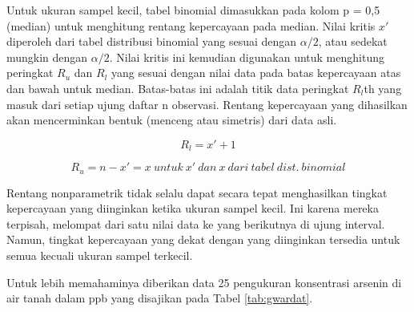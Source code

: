 \documentclass[]{book}
\begin{document}
Untuk ukuran sampel kecil, tabel binomial dimasukkan pada kolom p = 0,5
(median) untuk menghitung rentang kepercayaan pada median. Nilai kritis
\(x'\) diperoleh dari tabel distribusi binomial yang sesuai dengan
\(\alpha/2\), atau sedekat mungkin dengan \(\alpha/2\). Nilai kritis ini
kemudian digunakan untuk menghitung peringkat \(R_u\) dan \(R_l\) yang
sesuai dengan nilai data pada batas kepercayaan atas dan bawah untuk
median. Batas-batas ini adalah titik data peringkat \(R_l\)th yang masuk
dari setiap ujung daftar n observasi. Rentang kepercayaan yang
dihasilkan akan mencerminkan bentuk (menceng atau simetris) dari data
asli.

\begin{equation}
  R_l=x'+1 
  \label{eq:rl}
\end{equation}

\begin{equation}
  R_u=n-x'=x\ untuk\ x'\ dan\ x\ dari\ tabel\ dist.\ binomial 
  \label{eq:ru}
\end{equation}

Rentang nonparametrik tidak selalu dapat secara tepat menghasilkan
tingkat kepercayaan yang diinginkan ketika ukuran sampel kecil. Ini
karena mereka terpisah, melompat dari satu nilai data ke yang berikutnya
di ujung interval. Namun, tingkat kepercayaan yang dekat dengan yang
diinginkan tersedia untuk semua kecuali ukuran sampel terkecil.

Untuk lebih memahaminya diberikan data 25 pengukuran konsentrasi arsenin
di air tanah dalam ppb yang disajikan pada Tabel \ref{tab:gwardat}.
\end{document}
